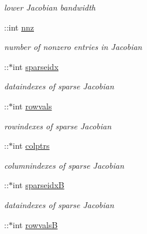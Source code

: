 \begin{DoxyCompactItemize}
\begin{DoxyCompactList}\small\item\em lower Jacobian bandwidth \end{DoxyCompactList}\item 
\hypertarget{classamimodel_a825ec588729c090ff51ea3473dcbc6b9}{}\+::int \hyperlink{classamimodel_a825ec588729c090ff51ea3473dcbc6b9}{nnz}\label{classamimodel_a825ec588729c090ff51ea3473dcbc6b9}

\begin{DoxyCompactList}\small\item\em number of nonzero entries in Jacobian \end{DoxyCompactList}\item 
\hypertarget{classamimodel_a6ffb112eda9ff756e17104210981b30b}{}\+::$\ast$int \hyperlink{classamimodel_a6ffb112eda9ff756e17104210981b30b}{sparseidx}\label{classamimodel_a6ffb112eda9ff756e17104210981b30b}

\begin{DoxyCompactList}\small\item\em dataindexes of sparse Jacobian \end{DoxyCompactList}\item 
\hypertarget{classamimodel_aa0abea3560da3f409a28567f42d52872}{}\+::$\ast$int \hyperlink{classamimodel_aa0abea3560da3f409a28567f42d52872}{rowvals}\label{classamimodel_aa0abea3560da3f409a28567f42d52872}

\begin{DoxyCompactList}\small\item\em rowindexes of sparse Jacobian \end{DoxyCompactList}\item 
\hypertarget{classamimodel_a887e8a11654afa197d040d8bb10cbb38}{}\+::$\ast$int \hyperlink{classamimodel_a887e8a11654afa197d040d8bb10cbb38}{colptrs}\label{classamimodel_a887e8a11654afa197d040d8bb10cbb38}

\begin{DoxyCompactList}\small\item\em columnindexes of sparse Jacobian \end{DoxyCompactList}\item 
\hypertarget{classamimodel_adcfae93a688a66f1954d0832f51e4cc0}{}\+::$\ast$int \hyperlink{classamimodel_adcfae93a688a66f1954d0832f51e4cc0}{sparseidx\+B}\label{classamimodel_adcfae93a688a66f1954d0832f51e4cc0}

\begin{DoxyCompactList}\small\item\em dataindexes of sparse Jacobian \end{DoxyCompactList}\item 
\hypertarget{classamimodel_a1ba81ee0e28fe7c7576911973c82be70}{}\+::$\ast$int \hyperlink{classamimodel_a1ba81ee0e28fe7c7576911973c82be70}{rowvals\+B}\label{classamimodel_a1ba81ee0e28fe7c7576911973c82be70}


\end{DoxyCompactItemize}
